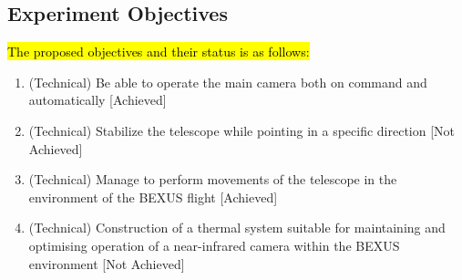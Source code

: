 \subsection{Experiment Objectives}


\hl{The proposed objectives and their status is as follows:}
\renewcommand{\labelenumi}{\Roman{enumi}}
\begin{enumerate}
    \item (Technical) Be able to operate the main camera both on command and automatically [Achieved]
    \item (Technical) Stabilize the telescope while pointing in a specific direction [Not Achieved]
    \item (Technical) Manage to perform movements of the telescope in the environment of the BEXUS flight [Achieved]
    \item (Technical) Construction of a thermal system suitable for maintaining and optimising operation of a near-infrared camera within the BEXUS environment [Not Achieved]
\end{enumerate}

